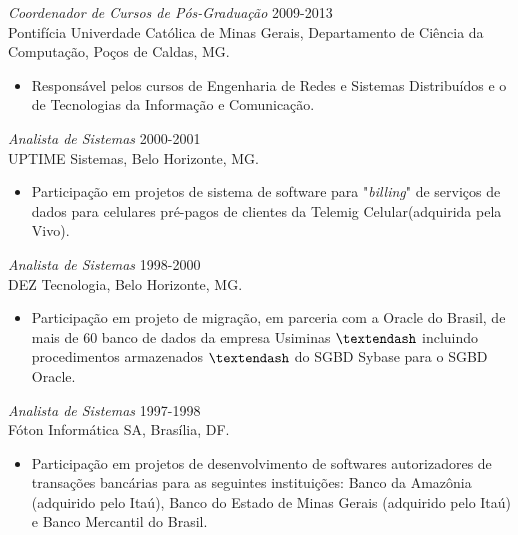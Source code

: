 \documentclass[margin, 10pt]{res}
\begin{document}
\begin{resume}
  {\sl Coordenador de Cursos de Pós-Graduação} \hfill 2009-2013 \\ 
  Pontifícia Univerdade Católica de Minas Gerais, Departamento de Ciência da Computação, Poços de Caldas, MG. 
    \begin{itemize} \itemsep -2pt %
      \item Responsável pelos cursos de Engenharia de Redes e Sistemas Distribuídos e o de Tecnologias da Informação e Comunicação.
    \end{itemize}
  
  {\sl Analista de Sistemas } \hfill 2000-2001 \\
  UPTIME Sistemas, Belo Horizonte, MG.
    \begin{itemize} \itemsep -2pt %
      \item Participação em projetos de sistema de software para "\textit{billing}" de serviços de dados para celulares pré-pagos de 
	clientes da Telemig Celular(adquirida pela Vivo).
    \end{itemize}

  {\sl Analista de Sistemas } \hfill 1998-2000 \\
  DEZ Tecnologia, Belo Horizonte, MG.
    \begin{itemize} \itemsep -2pt %
      \item Participação em projeto de migração, em parceria com a Oracle do Brasil, de mais de 60 banco de dados da empresa Usiminas $\textendash$ incluindo procedimentos armazenados  $\textendash$ do 
      SGBD Sybase para o SGBD Oracle.
    \end{itemize}

  {\sl Analista de Sistemas } \hfill 1997-1998 \\
  Fóton Informática SA, Brasília, DF.
    \begin{itemize} \itemsep -2pt %
      \item Participação em projetos de desenvolvimento de softwares autorizadores de transações bancárias para as seguintes instituições: Banco da Amazônia (adquirido pelo Itaú),
      Banco do Estado de Minas Gerais (adquirido pelo Itaú) e Banco Mercantil do Brasil.
    \end{itemize}


\end{resume}
\end{document}
